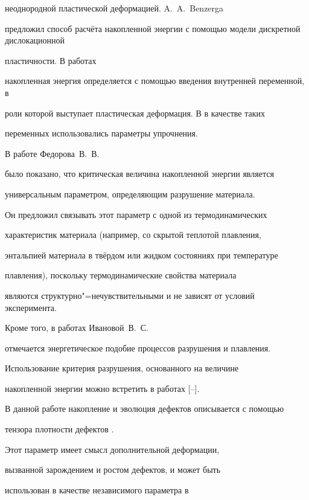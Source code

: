 неоднородной пластической деформацией. A.~A.~Benzerga  \cite{kostina:bib:BenzergaBrechNeedl}

предложил способ расчёта накопленной энергии с помощью модели дискретной дислокационной

пластичности. В работах \cite{kostina:bib:StainierOrtiz,kostina:bib:RosakisRaviHodow}

накопленная энергия определяется с помощью введения внутренней переменной, в

роли которой выступает пластическая деформация. В  \cite{kostina:bib:XiaoChen,kostina:bib:DumoulinLouche} в качестве таких

переменных использовались параметры упрочнения.



В работе Федорова~В.~В.~\cite{kostina:bib:Fedorov}

было показано, что критическая величина накопленной энергии является

универсальным параметром, определяющим разрушение материала.

Он предложил связывать этот  параметр с одной из термодинамических

характеристик материала (например, со скрытой теплотой плавления,

энтальпией материала в твёрдом или жидком состояниях при температуре

плавления), поскольку термодинамические свойства материала

являются структурно"=нечувствительными и не зависят от условий эксперимента.

Кроме того, в работах Ивановой~В.~С.~\cite{kostina:bib:Ivanova}

отмечается энергетическое подобие процессов разрушения и плавления.

Использование критерия разрушения, основанного на величине

накопленной энергии можно встретить в работах  [--].



В данной работе накопление и эволюция дефектов описывается с помощью

тензора плотности дефектов \cite{kostina:bib:NaimarkP,kostina:bib:PlekNaim}.

Этот параметр имеет смысл дополнительной деформации,

вызванной зарождением и ростом дефектов, и может быть

использован в качестве независимого параметра в


